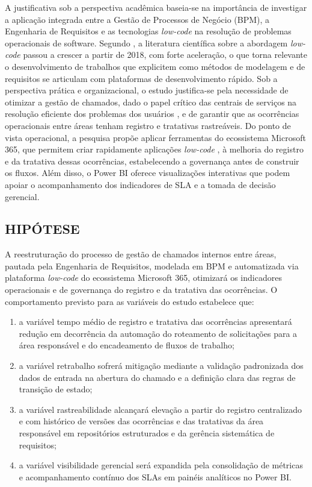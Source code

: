 A justificativa sob a perspectiva acadêmica baseia-se na importância de investigar a aplicação
  integrada entre a Gestão de Processos de Negócio (BPM), a Engenharia de Requisitos e as
  tecnologias \textit{low-code} na resolução de problemas operacionais de software.
Segundo \textcite{tosi2025}, a literatura científica sobre a abordagem \textit{low-code} passou a
  crescer a partir de 2018, com forte aceleração, o que torna relevante o desenvolvimento de
  trabalhos que explicitem como métodos de modelagem e de requisitos se articulam com plataformas de
  desenvolvimento rápido.
Sob a perspectiva prática e organizacional, o estudo justifica-se pela necessidade de otimizar a
  gestão de chamados, dado o papel crítico das centrais de serviços na resolução eficiente dos
  problemas dos usuários \cite{nainggolan2025}, e de garantir que as ocorrências operacionais entre
  áreas tenham registro e tratativas rastreáveis.
Do ponto de vista operacional, a pesquisa propõe aplicar ferramentas do ecossistema Microsoft 365,
  que permitem criar rapidamente aplicações \textit{low-code} \cite{chaudhary2023}, à melhoria do
  registro e da tratativa dessas ocorrências, estabelecendo a governança antes de construir os
  fluxos.
Além disso, o Power BI oferece visualizações interativas \cite{chaudhary2023} que podem apoiar o
  acompanhamento dos indicadores de SLA e a tomada de decisão gerencial.
 
\subsection{HIPÓTESE}
 
A reestruturação do processo de gestão de chamados internos entre áreas, pautada pela Engenharia de
  Requisitos, modelada em BPM e automatizada via plataforma \textit{low-code} do ecossistema
  Microsoft 365, otimizará os indicadores operacionais e de governança do registro e da tratativa
  das ocorrências.
O comportamento previsto para as variáveis do estudo estabelece que:
 
{\renewcommand{\labelenumi}{\alph{enumi})}
\begin{enumerate}
  \item a variável tempo médio de registro e tratativa das ocorrências apresentará redução em
      decorrência da automação do roteamento de solicitações para a área responsável e do
      encadeamento de fluxos de trabalho;
  \item a variável retrabalho sofrerá mitigação mediante a validação padronizada dos dados de
      entrada na abertura do chamado e a definição clara das regras de transição de estado;
  \item a variável rastreabilidade alcançará elevação a partir do registro centralizado e com
      histórico de versões das ocorrências e das tratativas da área responsável em repositórios
      estruturados e da gerência sistemática de requisitos;
  \item a variável visibilidade gerencial será expandida pela consolidação de métricas e
      acompanhamento contínuo dos SLAs em painéis analíticos no Power BI.
\end{enumerate}}
 
